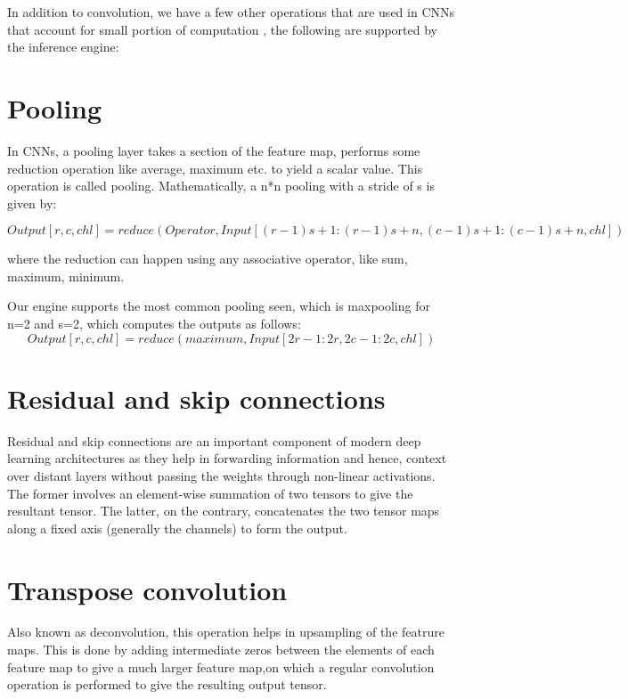 \documentclass[a4paper,12pt, final]{report}
\begin{document}
In addition to convolution, we have a few other operations that are used in CNNs that account for small portion of computation , the following are supported by the inference engine:

\section{Pooling}

In CNNs, a pooling layer takes a section of the feature map, performs some reduction operation like average, maximum etc. to yield a scalar value. This operation is called pooling. Mathematically, a n*n pooling with a stride of s is given by:

\begin{equation*}
	Output[r,c,chl] = reduce(Operator,Input[(r-1)s+1:(r-1)s+n,(c-1)s+1:(c-1)s+n,chl])
\end{equation*}

where the reduction can happen using any associative operator, like sum, maximum, minimum.

Our engine supports the most common pooling seen, which is maxpooling for n=2 and s=2, which computes the outputs as follows:
\begin{equation*}
	Output[r,c,chl] = reduce(maximum,Input[2r-1:2r,2c-1:2c,chl])
\end{equation*}


\section{Residual and skip connections}

Residual and skip connections are an important component of modern deep learning architectures as they help in forwarding information and hence, context over distant layers without passing the weights through non-linear activations. The former involves an element-wise summation of two tensors to give the resultant tensor. The latter, on the contrary, concatenates the two tensor maps along a fixed axis (generally the channels) to form the output.

\section{Transpose convolution}

Also known as deconvolution, this operation helps in upsampling of the featrure maps. This is done by adding intermediate zeros between the elements of each feature map to give a much larger feature map,on which a regular convolution operation is performed to give the resulting output tensor.
\end{document}
